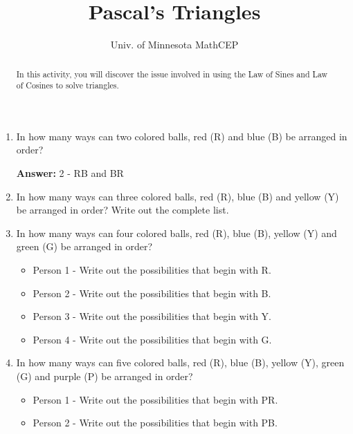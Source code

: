 \documentclass[number]{ximera}
\title{Pascal's Triangles}
\author{Univ. of Minnesota MathCEP}
\begin{document}
\begin{abstract}
  In this activity, you will discover the issue involved in using the Law of Sines and Law of Cosines to solve triangles.
\end{abstract}

\maketitle

\begin{enumerate} 

\item In how many ways can two colored balls, red (R) and blue (B) be arranged in order?

\bigskip

{\bf {Answer:}} 2 - RB and BR

\item In how many ways can three colored balls, red (R), blue (B) and yellow (Y) be arranged in order? Write out the complete list.

\item In how many ways can four colored balls, red (R), blue (B), yellow (Y) and green (G) be arranged in order?

\begin{itemize}

\item Person 1 - Write out the possibilities that begin with R.

\item Person 2 - Write out the possibilities that begin with B.

\item Person 3 - Write out the possibilities that begin with Y.

\item Person 4 - Write out the possibilities that begin with G.

\end{itemize}

\item In how many ways can five colored balls, red (R), blue (B), yellow (Y), green (G) and purple (P) be arranged in order?

\begin{itemize}

\item Person 1 - Write out the possibilities that begin with PR.

\item Person 2 - Write out the possibilities that begin with PB.


\end{itemize}
\end{enumerate}
\end{document}
